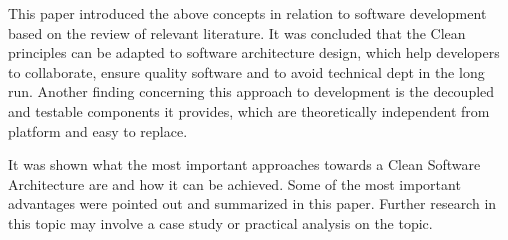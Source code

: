 \documentclass[conference]{IEEEtran}
\begin{document}
This paper introduced the above concepts in relation to software development based on the review of relevant literature. It was concluded that the Clean principles can be adapted to software architecture design, which help developers to collaborate, ensure quality software and to avoid technical dept in the long run. Another finding concerning this approach to development is the decoupled and testable components it provides, which are theoretically independent from platform and easy to replace. 

It was shown what the most important approaches towards a Clean Software Architecture are and how it can be achieved. Some of the most important advantages were pointed out and summarized in this paper. Further research in this topic may involve a case study or practical analysis on the topic. 
\end{document}

